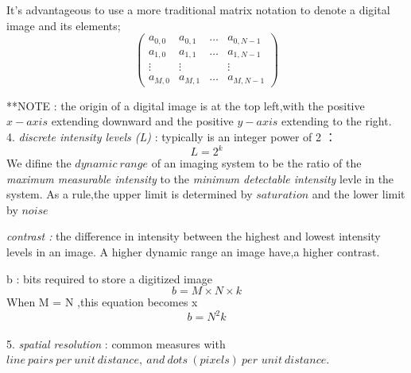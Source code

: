 \documentclass[12pt]{article}
\begin{document}
It's advantageous to use a more traditional matrix notation to denote a digital image and its elements;
\[
\left(\begin{array}{cccc}
a_{0,0} & a_{0,1} & \ldots & a_{0,N-1}\\
a_{1,0} & a_{1,1} & \ldots & a_{1,N-1}\\
\vdots & \vdots & \  & \vdots\\
a_{M,0} & a_{M,1} & \ldots & a_{M,N-1}
\end{array}\right)
\]

**NOTE : the origin of a digital image is at the top left,with the positive \begin{math} x-axis \end{math} extending downward and the positive \begin{math}y-axis \end{math} extending to the right. 
\\
4. \textsl{discrete intensity levels (L)} : typically is an integer power of 2 ：
\begin{displaymath}
L=2^k
\end{displaymath}
We difine the \begin{math}dynamic\ range \end{math} of an imaging system to be the ratio of the \textsl{maximum measurable intensity} to the \textsl{minimum detectable intensity} levle in the system. As a rule,the upper limit is determined by \begin{math} saturation \end{math} and the lower limit by \begin{math} noise \end{math}

\textsl{contrast :} the difference in intensity between the highest and lowest intensity levels in an image. A higher dynamic range an image have,a higher contrast.

b : bits required to store a digitized image
\begin{displaymath}
b = M \times N \times k
\end{displaymath}
\quad When M = N ,this equation becomes x
\begin{displaymath}
b=N^2k
\end{displaymath}
\\
5. \textsl{spatial resolution }: common measures with \begin{math} line\ pairs\ per\ unit\ distance,\ and\ dots\ (pixels)\ per\end{math} \begin{math} unit\ distance.\end{math}
\end{document}
